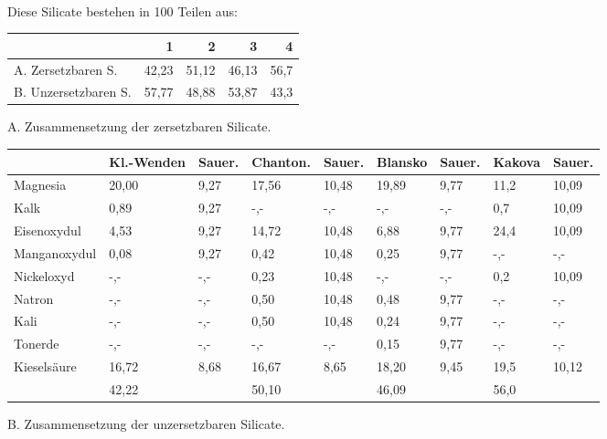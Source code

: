 \documentclass[a4paper, 11pt, oneside]{article}
\begin{document}
\paragraph{}
Diese Silicate bestehen in 100 Teilen aus:
\begin{center}
\begin{tabular}{ |l|r|r|r|r| }
    \hline
     & 1 & 2 & 3 & 4\\
    \hline\hline
    A. Zersetzbaren S. & 42,23 & 51,12 & 46,13 & 56,7\\\hline
    B. Unzersetzbaren S. & 57,77 & 48,88 & 53,87 & 43,3\\
    \hline
\end{tabular}
\end{center}
\clearpage
\begin{center}
A. Zusammensetzung der zersetzbaren Silicate.
\end{center}
\begin{center}
\begin{tabular}{ |p{23mm}|p{12mm}|p{8mm}|p{13mm}|p{8mm}|p{11mm}|p{8mm}|p{10mm}|p{8mm}| }
    \hline
     & Kl.-Wenden & Sauer. & Chanton. & Sauer. & Blansko & Sauer. & Kakova & Sauer.\\
    \hline\hline
    Magnesia & 20,00 & 9,27 & 17,56 & 10,48 & 19,89 & 9,77 & 11,2 & 10,09\\\hline
    Kalk & 0,89 & 9,27 & -,- & -,- & -,- & -,- & 0,7 & 10,09\\\hline
    Eisenoxydul & 4,53 & 9,27 & 14,72 & 10,48 & 6,88 & 9,77 & 24,4 & 10,09\\\hline
    Manganoxydul & 0,08 & 9,27 & 0,42 & 10,48 & 0,25 & 9,77 & -,- & -,-\\\hline
    Nickeloxyd & -,- & -,- & 0,23 & 10,48 & -,- & -,- & 0,2 & 10,09\\\hline
    Natron & -,- & -,- & 0,50 & 10,48 & 0,48 & 9,77 & -,- & -,-\\\hline
    Kali & -,- & -,- & 0,50 & 10,48 & 0,24 & 9,77 & -,- & -,-\\\hline
    Tonerde & -,- & -,- & -,- & -,- & 0,15 & 9,77 & -,- & -,-\\\hline
    Kieselsäure & 16,72 & 8,68 & 16,67 & 8,65 & 18,20 & 9,45 & 19,5 & 10,12\\\hline
     & 42,22 & & 50,10 & & 46,09 & & 56,0 & \\
    \hline
\end{tabular}
\end{center}
\vspace{\medskipamount}
\begin{center}
B. Zusammensetzung der unzersetzbaren Silicate.
\end{center}
\end{document}
